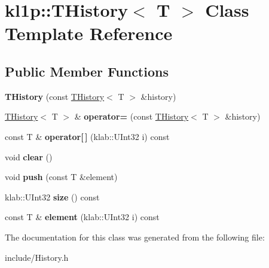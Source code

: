 \hypertarget{classkl1p_1_1THistory}{}\section{kl1p\+:\+:T\+History$<$ T $>$ Class Template Reference}
\label{classkl1p_1_1THistory}
\subsection*{Public Member Functions}
\begin{DoxyCompactItemize}
\item 
{\bfseries T\+History} (const \hyperlink{classkl1p_1_1THistory}{T\+History}$<$ T $>$ \&history)\hypertarget{classkl1p_1_1THistory_a044f45691a94a00aa01f1a1d87453f36}{}\label{classkl1p_1_1THistory_a044f45691a94a00aa01f1a1d87453f36}

\item 
\hyperlink{classkl1p_1_1THistory}{T\+History}$<$ T $>$ \& {\bfseries operator=} (const \hyperlink{classkl1p_1_1THistory}{T\+History}$<$ T $>$ \&history)\hypertarget{classkl1p_1_1THistory_aa0d9bde928573690d0c5f512f8db0a99}{}\label{classkl1p_1_1THistory_aa0d9bde928573690d0c5f512f8db0a99}

\item 
const T \& {\bfseries operator\mbox{[}$\,$\mbox{]}} (klab\+::\+U\+Int32 i) const \hypertarget{classkl1p_1_1THistory_ae6c5cdbfb60dfba396ab3ae0641b7a1a}{}\label{classkl1p_1_1THistory_ae6c5cdbfb60dfba396ab3ae0641b7a1a}

\item 
void {\bfseries clear} ()\hypertarget{classkl1p_1_1THistory_a6eedd4bc047d0f15c665b6c55061fb03}{}\label{classkl1p_1_1THistory_a6eedd4bc047d0f15c665b6c55061fb03}

\item 
void {\bfseries push} (const T \&element)\hypertarget{classkl1p_1_1THistory_a93644f4c1ae14036714da8c8a360cdf8}{}\label{classkl1p_1_1THistory_a93644f4c1ae14036714da8c8a360cdf8}

\item 
klab\+::\+U\+Int32 {\bfseries size} () const \hypertarget{classkl1p_1_1THistory_a05fa148ac119fce2cccf2935440fca10}{}\label{classkl1p_1_1THistory_a05fa148ac119fce2cccf2935440fca10}

\item 
const T \& {\bfseries element} (klab\+::\+U\+Int32 i) const \hypertarget{classkl1p_1_1THistory_a581351c161362ef7a02c4b799250f193}{}\label{classkl1p_1_1THistory_a581351c161362ef7a02c4b799250f193}

\end{DoxyCompactItemize}


The documentation for this class was generated from the following file\+:\begin{DoxyCompactItemize}
\item 
include/History.\+h\end{DoxyCompactItemize}
